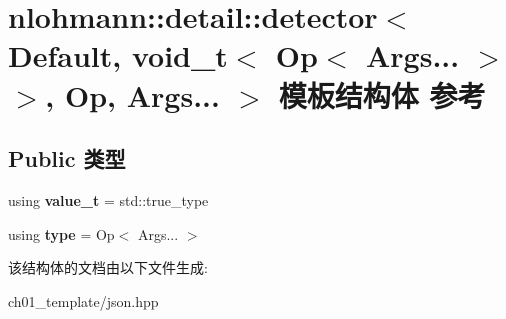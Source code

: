 \hypertarget{structnlohmann_1_1detail_1_1detector_3_01_default_00_01void__t_3_01_op_3_01_args_8_8_8_01_4_01_4_00_01_op_00_01_args_8_8_8_01_4}{}\section{nlohmann\+::detail\+::detector$<$ Default, void\+\_\+t$<$ Op$<$ Args... $>$ $>$, Op, Args... $>$ 模板结构体 参考}
\label{structnlohmann_1_1detail_1_1detector_3_01_default_00_01void__t_3_01_op_3_01_args_8_8_8_01_4_01_4_00_01_op_00_01_args_8_8_8_01_4}
\subsection*{Public 类型}
\begin{DoxyCompactItemize}
\item 
\mbox{\label{structnlohmann_1_1detail_1_1detector_3_01_default_00_01void__t_3_01_op_3_01_args_8_8_8_01_4_01_4_00_01_op_00_01_args_8_8_8_01_4_ab748f9f00bb31bee4978a033589f8c85}} 
using {\bfseries value\+\_\+t} = std\+::true\+\_\+type
\item 
\mbox{\label{structnlohmann_1_1detail_1_1detector_3_01_default_00_01void__t_3_01_op_3_01_args_8_8_8_01_4_01_4_00_01_op_00_01_args_8_8_8_01_4_a5afd6a40e94dde21d120ac646468c495}} 
using {\bfseries type} = Op$<$ Args... $>$
\end{DoxyCompactItemize}


该结构体的文档由以下文件生成\+:\begin{DoxyCompactItemize}
\item 
ch01\+\_\+template/json.\+hpp\end{DoxyCompactItemize}
